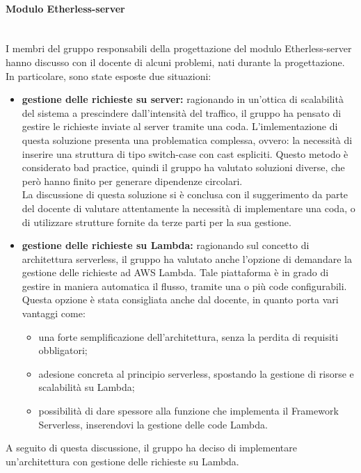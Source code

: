 	\paragraph{Modulo Etherless-server}\mbox{}\\
		I membri del gruppo responsabili della progettazione del modulo Etherless-server hanno discusso con il docente di alcuni problemi, nati durante la progettazione. In particolare, sono state esposte due situazioni:
		\begin{itemize}
			\item \textbf{gestione delle richieste su server:} ragionando in un’ottica di scalabilità del sistema a prescindere dall’intensità del traffico, il gruppo ha pensato di gestire le richieste inviate al server tramite una coda. L’imlementazione di questa soluzione presenta una problematica complessa, ovvero: la necessità di inserire una struttura di tipo switch-case con cast espliciti. Questo metodo è considerato bad practice, quindi il gruppo ha valutato soluzioni diverse, che però hanno finito per generare dipendenze circolari.\\La discussione di questa soluzione si è conclusa con il suggerimento da parte del docente di valutare attentamente la necessità di implementare una coda, o di utilizzare strutture fornite da terze parti per la sua gestione.
			\item \textbf{gestione delle richieste su Lambda:} ragionando sul concetto di architettura serverless, il gruppo ha valutato anche l’opzione di demandare la gestione delle richieste ad AWS Lambda. Tale piattaforma è in grado di gestire in maniera automatica il flusso, tramite una o più code configurabili. Questa opzione è stata consigliata anche dal docente, in quanto porta vari vantaggi come:
			\begin{itemize}
				\item una forte semplificazione dell’architettura, senza la perdita di requisiti obbligatori;
				\item adesione concreta al principio serverless, spostando la gestione di risorse e scalabilità su Lambda;
				\item possibilità di dare spessore alla funzione che implementa il Framework Serverless, inserendovi la gestione delle code Lambda.
			\end{itemize}
		\end{itemize}
		A seguito di questa discussione, il gruppo ha deciso di implementare un'architettura con gestione delle richieste su Lambda.
